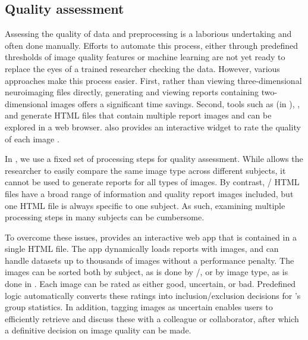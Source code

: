\subsection{Quality assessment}\label{sec:qamethods}

Assessing the quality of data and preprocessing is a laborious undertaking and often done manually. Efforts to automate this process, either through predefined thresholds of image quality features \parencite{alfaroalmagro2018} or machine learning \parencite{esteban2017} are not yet ready to replace the eyes of a trained researcher checking the data. However, various approaches make this process easier. First, rather than viewing three-dimensional neuroimaging files directly, generating and viewing reports containing two-dimensional images offers a significant time savings. Second, tools such as  (in ), , and  generate HTML files that contain multiple report images and can be explored in a web browser.  also provides an interactive widget to rate the quality of each image \parencite{esteban2019b}.

In , we use a fixed set of processing steps for quality assessment. While  allows the researcher to easily compare the same image type across different subjects, it cannot be used to generate reports for all types of images. By contrast, / HTML files have a broad range of information and quality report images included, but one HTML file is always specific to one subject. As such, examining multiple processing steps in many subjects can be cumbersome.

To overcome these issues,  provides an interactive web app that is contained in a single HTML file. The app dynamically loads reports with images, and can handle datasets up to thousands of images without a performance penalty. The images can be sorted both by subject, as is done by /, or by image type, as is done in . Each image can be rated as either good, uncertain, or bad. Predefined logic automatically converts these ratings into inclusion/exclusion decisions for 's group statistics. In addition, tagging images as uncertain enables users to efficiently retrieve and discuss these with a colleague or collaborator, after which a definitive decision on image quality can be made.
